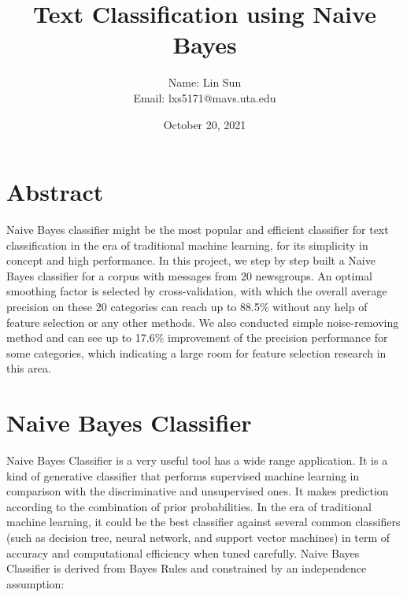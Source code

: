 \documentclass{article}
\begin{document}
\title{Text Classification using Naive Bayes}

\date{October 20, 2021}

\author{%
	Name: Lin Sun\\
	Email: lxs5171@mavs.uta.edu
}

\maketitle

\section*{Abstract}

Naive Bayes classifier might be the most popular and efficient classifier for text classification in the era of traditional machine learning, for its simplicity in concept and high performance. In this project, we step by step built a Naive Bayes classifier for a corpus with messages from 20 newsgroups. An optimal smoothing factor is selected by cross-validation, with which the overall average precision on these 20 categories can reach up to 88.5\% without any help of feature selection or any other methods. We also conducted simple noise-removing method and can see up to 17.6\% improvement of the precision performance for some categories, which indicating a large room for feature selection research in this area.

\section{Naive Bayes Classifier}
\label{sec:nb-classifier}

Naive Bayes Classifier is a very useful tool has a wide range application. It is a kind of generative classifier that performs supervised machine learning in comparison with the discriminative and unsupervised ones. It makes prediction according to the combination of prior probabilities. In the era of traditional machine learning, it could be the best classifier against several common classifiers (such as decision tree, neural network, and support vector machines) in term of accuracy and computational efficiency \cite{is-nb-good} when tuned carefully. Naive Bayes Classifier is derived from Bayes Rules \cite{bayes-rule} and constrained by an independence assumption:
\end{document}
